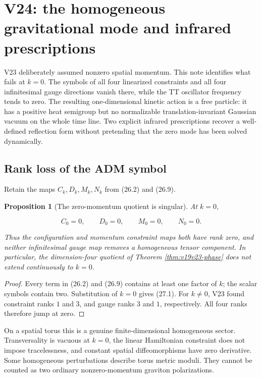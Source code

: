 \documentclass[11pt]{article}
\newtheorem{proposition}[theorem]{Proposition}
\theoremstyle{remark}
\begin{document}
\section{V24: the homogeneous gravitational mode and infrared prescriptions}
\label{sec:v19v24}

V23 deliberately assumed nonzero spatial momentum.  This note identifies
what fails at \(k=0\).  The symbols of all four linearized constraints and
all four infinitesimal gauge directions vanish there, while the TT
oscillator frequency tends to zero.  The resulting one-dimensional
kinetic action is a free particle: it has a positive heat semigroup but no
normalizable translation-invariant Gaussian vacuum on the whole time
line.  Two explicit infrared prescriptions recover a well-defined
reflection form without pretending that the zero mode has been solved
dynamically.

\subsection{Rank loss of the ADM symbol}

Retain the maps \(C_k,D_k,M_k,N_k\) from (26.2) and (26.9).

\begin{proposition}[The zero-momentum quotient is singular]
\label{prop:v19v24-rank}
At \(k=0\),

\[
 C_0=0,\qquad D_0=0,\qquad M_0=0,\qquad N_0=0.                \tag{27.1}
\]

Thus the configuration and momentum constraint maps both have rank zero,
and neither infinitesimal gauge map removes a homogeneous tensor
component.  In particular, the dimension-four quotient of Theorem
\ref{thm:v19v23-phase} does not extend continuously to \(k=0\).
\end{proposition}

\begin{proof}
Every term in (26.2) and (26.9) contains at least one factor of \(k\);
the scalar symbols contain two.  Substitution of \(k=0\) gives (27.1).
For \(k\neq0\), V23 found constraint ranks \(1\) and \(3\), and gauge
ranks \(3\) and \(1\), respectively.  All four ranks therefore jump at
zero.
\end{proof}

On a spatial torus this is a genuine finite-dimensional homogeneous
sector.  Transversality is vacuous at \(k=0\), the linear Hamiltonian
constraint does not impose tracelessness, and constant spatial
diffeomorphisms have zero derivative.  Some homogeneous perturbations
describe torus metric moduli.  They cannot be counted as two ordinary
nonzero-momentum graviton polarizations.
\end{document}
